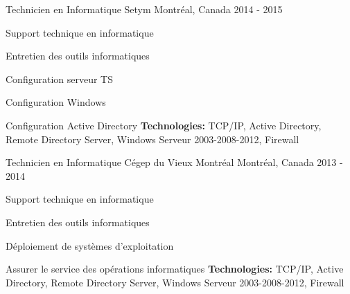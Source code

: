 \begin{cventries}
  \cventry
    {Technicien en Informatique}
    {Setym}
    {Montréal, Canada}
    {2014 - 2015}
    {
      \begin{cvitems}
        \item {Support technique en informatique}
        \item {Entretien des outils informatiques}
        \item {Configuration serveur TS}
        \item {Configuration Windows}
        \item {Configuration Active Directory}
        \newline
        \vspace{3mm}
        \textbf{Technologies: }{TCP/IP, Active Directory, Remote Directory Server, Windows Serveur 2003-2008-2012, Firewall}
      \end{cvitems}
    }
    \vspace{3mm}
    
  \cventry
    {Technicien en Informatique}
    {Cégep du Vieux Montréal}
    {Montréal, Canada}
    {2013 - 2014}
    {
      \begin{cvitems}
        \item {Support technique en informatique}
        \item {Entretien des outils informatiques}
        \item {Déploiement de systèmes d’exploitation}
        \item {Assurer le service des opérations informatiques}
        \newline
        \vspace{3mm}
        \textbf{Technologies: }{TCP/IP, Active Directory, Remote Directory Server, Windows Serveur 2003-2008-2012, Firewall}
      \end{cvitems}
    }
\end{cventries}
\vspace{5mm}